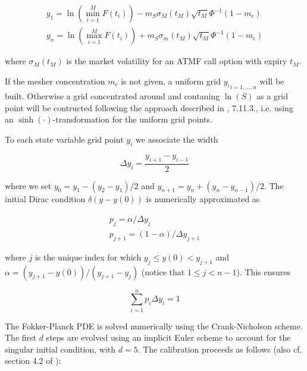 {\begin{eqnarray}
y_1 = \ln \left( \min_{i=1}^M F(t_i) \right) - m_S \sigma_M(t_M)\sqrt{t_M} \Phi^{-1}(1 - m_\epsilon) \\
y_n = \ln \left( \max_{i=1}^M F(t_i) \right) + m_S \sigma_m(t_M)\sqrt{t_M} \Phi^{-1}(1 - m_\epsilon)
\end{eqnarray}

where $\sigma_M(t_M)$ is the market volatility for an ATMF call option with expiry $t_M$.

If the mesher concentration $m_c$ is not given, a uniform grid ${y_i}_{i=1,\ldots,n}$ will be built. Otherwise a grid
concentrated around and contaning $\ln(S)$ as a grid point will be contructed following the approach described in
\cite{Clark_FXBook}, 7.11.3., i.e. using an $\sinh(\cdot)$-transformation for the uniform grid points.

To each state variable grid point $y_i$ we associate the width

\begin{equation}
\Delta y_i = \frac{y_{i+1} - y_{i-1}}{2}
\end{equation}

where we set $y_0 =y_1 - (y_2 - y_1) / 2$ and $y_{n+1} = y_n + (y_n - y_{n-1}) / 2$. The initial Dirac condition
$\delta(y-y(0))$ is numerically approximated as

\begin{eqnarray}
  p_j = \alpha / \Delta y_j \\
  p_{j+1} = (1-\alpha) / \Delta y_{j+1}
\end{eqnarray}

where $j$ is the unique index for which $y_j \leq y(0) < y_{j+1}$ and $\alpha = (y_{j+1} - y(0)) / (y_{j+1}-y_j)$
(notice that $1 \leq j < n - 1$). This ensures

\begin{equation}
  \sum_{i=1}^n p_i \Delta y_i = 1
\end{equation}

The Fokker-Planck PDE is solved numerically using the Crank-Nicholson scheme. The first $d$ steps are evolved using an
implicit Euler scheme to account for the singular initial condition, with $d=5$. The calibration proceeds as follows
(also cf. section 4.2 of \cite{Andersen_Buffum_2002}):

}
